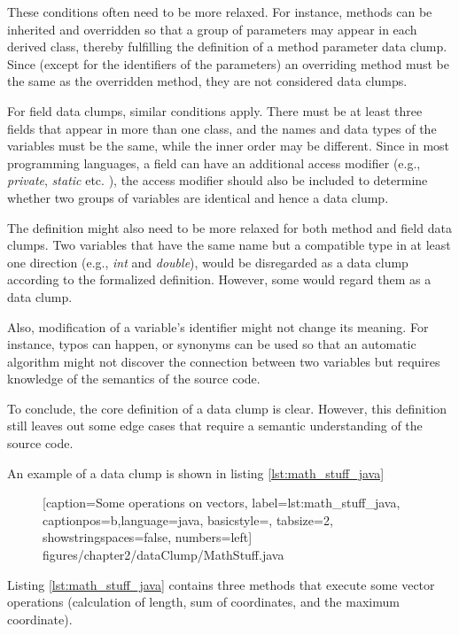 These conditions often need to be more relaxed. For instance, methods can be inherited and overridden so that a group of parameters may appear in each derived class, thereby fulfilling the definition of a method parameter data clump. Since (except for the identifiers of the parameters) an overriding method must be the same as the overridden method, they are not considered data clumps.

For field data clumps, similar conditions apply. There must be at least three fields that appear in more than one class, and the names and data types of the variables must be the same, while the inner order may be different. Since in most programming languages, a field can have an additional access modifier (e.g., \textit{private}, \textit{static} etc. ), the access modifier should also be included to determine whether two groups of variables are identical and hence a data clump.  

The definition might also need to be more relaxed for both method and field data clumps. Two variables that have the same name but a compatible type in at least one direction  (e.g., \textit{int} and  \textit{double}), would be disregarded as a data clump according to the formalized definition. However, some would regard them as a data clump.

Also, modification of a variable's identifier might not change its meaning. For instance, typos can happen, or synonyms can be used so that an automatic algorithm might not discover the connection between two variables but requires knowledge of the semantics of the source code. \cite{zhangImprovingPrecisionFowler2008}


To conclude, the core definition of a data clump is clear. However, this definition still leaves out some edge cases that require a semantic understanding of the source code. 

An example of a data clump is shown in listing \ref{lst:math_stuff_java}
\begin{figure} [htbp!]
			
			[caption={Some operations on vectors},
			label={lst:math_stuff_java},
			captionpos=b,language=java, basicstyle=\footnotesize, tabsize=2, showstringspaces=false,  numbers=left]
			{figures/chapter2/dataClump/MathStuff.java}
		\end{figure}



Listing \ref{lst:math_stuff_java} contains three methods that execute some vector operations (calculation of length, sum of coordinates, and the maximum coordinate). 



